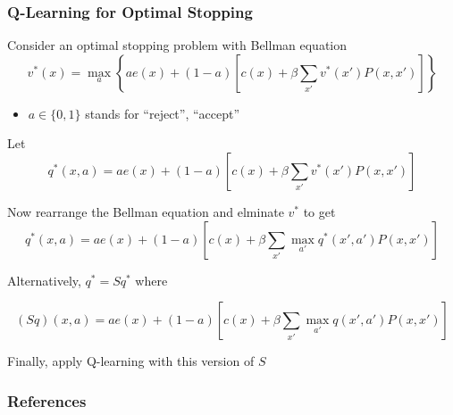 \documentclass[xcolor=dvipsnames]{beamer}  %
\newcommand{\1}{\mathbbm 1}
\begin{document}
\begin{frame}
    \frametitle{Q-Learning for Optimal Stopping}

    Consider an optimal stopping problem with Bellman equation
    \begin{equation*}
        v^*(x) = \max_a
        \left\{
            a e(x) + (1-a)
            \left[ 
                c(x) + \beta \sum_{x'} v^*(x')P(x,x')
            \right]
        \right\}
    \end{equation*}

    \begin{itemize}
        \item $a \in \{0, 1\}$ stands for ``reject'', ``accept''
    \end{itemize}

    Let
    \begin{equation*}
        q^*(x,a) =
            a e(x) + (1-a)
            \left[ 
                c(x) + \beta \sum_{x'} v^*(x')P(x,x')
            \right]
    \end{equation*}

\end{frame}


\begin{frame}
    
    Now rearrange the Bellman equation and elminate $v^*$ to get
    \begin{equation*}
        q^*(x,a) =
            a e(x) + (1-a)
            \left[ 
                c(x) + \beta \sum_{x'} \max_{a'}  q^*(x', a')P(x,x')
            \right]
    \end{equation*}

    Alternatively, $q^* = S q^*$ where

    \begin{equation*}
        (Sq)(x,a) =
            a e(x) + (1-a)
            \left[ 
                c(x) + \beta \sum_{x'} \max_{a'}  q(x', a')P(x,x')
            \right]
    \end{equation*}

    Finally, apply Q-learning with this version of $S$

\end{frame}

\begin{frame}[allowframebreaks]
    \frametitle{References}

    

    

\end{frame}
\end{document}
